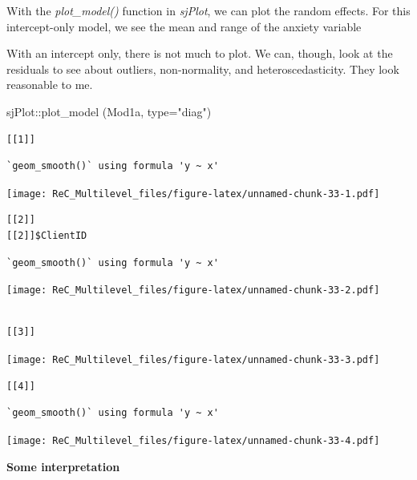 \documentclass[
  11pt,
]{book}
\newenvironment{Shaded}{\begin{snugshade}}{\end{snugshade}}
\newcommand{\AttributeTok}[1]{\textcolor[rgb]{0.77,0.63,0.00}{#1}}
\newcommand{\FunctionTok}[1]{\textcolor[rgb]{0.00,0.00,0.00}{#1}}
\newcommand{\NormalTok}[1]{#1}
\newcommand{\SpecialCharTok}[1]{\textcolor[rgb]{0.00,0.00,0.00}{#1}}
\newcommand{\StringTok}[1]{\textcolor[rgb]{0.31,0.60,0.02}{#1}}
\begin{document}
With the \emph{plot\_model()} function in \emph{sjPlot}, we can plot the random effects. For this intercept-only model, we see the mean and range of the anxiety variable

With an intercept only, there is not much to plot. We can, though, look at the residuals to see about outliers, non-normality, and heteroscedasticity. They look reasonable to me.

\begin{Shaded}
\begin{Highlighting}[]
\NormalTok{sjPlot}\SpecialCharTok{::}\FunctionTok{plot\_model}\NormalTok{ (Mod1a, }\AttributeTok{type=}\StringTok{"diag"}\NormalTok{)}
\end{Highlighting}
\end{Shaded}

\begin{verbatim}
[[1]]
\end{verbatim}

\begin{verbatim}
`geom_smooth()` using formula 'y ~ x'
\end{verbatim}

\texttt{[image: ReC\_Multilevel\_files/figure-latex/unnamed-chunk-33-1.pdf]}

\begin{verbatim}
[[2]]
[[2]]$ClientID
\end{verbatim}

\begin{verbatim}
`geom_smooth()` using formula 'y ~ x'
\end{verbatim}

\texttt{[image: ReC\_Multilevel\_files/figure-latex/unnamed-chunk-33-2.pdf]}

\begin{verbatim}

[[3]]
\end{verbatim}

\texttt{[image: ReC\_Multilevel\_files/figure-latex/unnamed-chunk-33-3.pdf]}

\begin{verbatim}
[[4]]
\end{verbatim}

\begin{verbatim}
`geom_smooth()` using formula 'y ~ x'
\end{verbatim}

\texttt{[image: ReC\_Multilevel\_files/figure-latex/unnamed-chunk-33-4.pdf]}

\textbf{Some interpretation}
\end{document}
